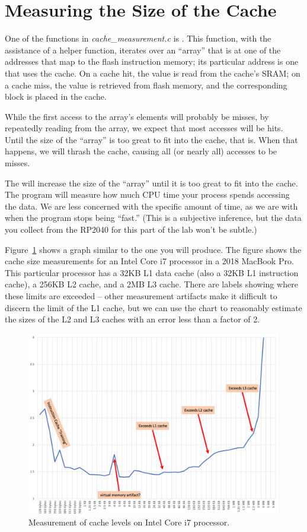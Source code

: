\section{Measuring the Size of the Cache}

One of the functions in \textit{cache\_measurement.c} is .
This function, with the assistance of a helper function, iterates over an ``array'' that  is at one of the addresses that map to the flash instruction memory;
its particular address is one that uses the cache.
On a cache hit, the value is read from the cache's SRAM;
on a cache miss, the value is retrieved from flash memory, and the corresponding block is placed in the cache.

While the first access to the array's elements will probably be misses,
by repeatedly reading from the array, we expect that most accesses will be hits.
Until the size of the ``array'' is too great to fit into the cache, that is.
When that happens, we will thrash the cache, causing all (or nearly all) accesses to be misses.

The  will increase the size of the ``array'' until it is too great to fit into the cache.
The program will measure how much CPU time your process spends accessing the data.
We are less concerned with the specific amount of time, as we are with when the program stops being ``fast.''
(This is a subjective inference, but the data you collect from the RP2040 for this part of the lab won't be subtle.)

Figure~\ref{fig:LaptopCache} shows a graph similar to the one you will produce.
The figure shows the cache size measurements for an Intel Core i7 processor in a 2018 MacBook Pro.
This particular processor has a 32KB L1 data cache (also a 32KB L1 instruction cache), a 256KB L2 cache, and a 2MB L3 cache.
There are labels showing where these limits are exceeded -- other measurement artifacts make it difficult to discern the limit of the L1 cache, but we can use the chart to reasonably estimate the sizes of the L2 and L3 caches with an error less than a factor of 2.

\begin{figure}
    \centering
    \includegraphics[width=13cm]{IntelI7caches}
    \caption{Measurement of cache levels on Intel Core i7 processor. \label{fig:LaptopCache}}
\end{figure}

